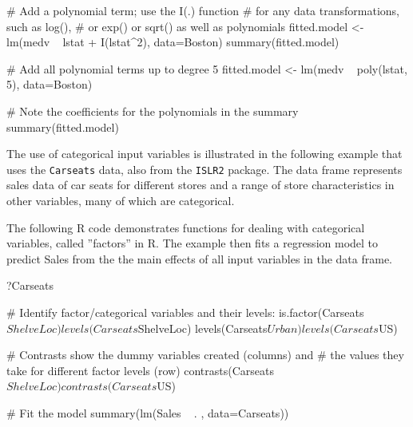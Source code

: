 \begin{samepage}
\begin{Rcode}
# Add a polynomial term; use the I(.) function
# for any data transformations, such as log(),
# or exp() or sqrt() as well as polynomials
fitted.model <- lm(medv ~ lstat + I(lstat^2), data=Boston)
summary(fitted.model)

# Add all polynomial terms up to degree 5
fitted.model <- lm(medv ~ poly(lstat, 5), data=Boston)

# Note the coefficients for the polynomials in the summary
summary(fitted.model)
\end{Rcode}
\end{samepage}

The use of categorical input variables is illustrated in the following example that uses the \texttt{Carseats} data, also from the \texttt{ISLR2} package. The data frame represents sales data of car seats for different stores and a range of store characteristics in other variables, many of which are categorical. 

The following R code demonstrates functions for dealing with categorical variables, called ''factors'' in R. The example then fits a regression model to predict Sales from the the main effects of all input variables in the data frame.

\begin{samepage}
\begin{Rcode}
?Carseats

# Identify factor/categorical variables and their levels:
is.factor(Carseats$ShelveLoc)
levels(Carseats$ShelveLoc)
levels(Carseats$Urban)
levels(Carseats$US)

# Contrasts show the dummy variables created (columns) and 
# the values they take for different  factor levels (row)
contrasts(Carseats$ShelveLoc)
contrasts(Carseats$US)

# Fit the model
summary(lm(Sales ~ . , data=Carseats))
\end{Rcode}
\end{samepage}

